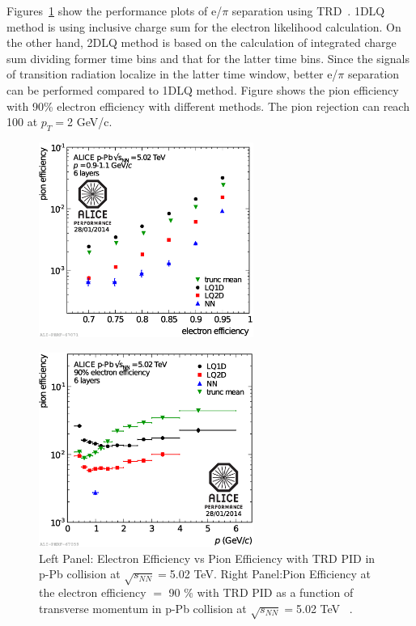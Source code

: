 Figures~\ref{fig_3_trdepi} show the performance plots of e/$\pi$ separation using TRD~\cite{bib_aprrun1}.
1DLQ method is using inclusive charge sum for the electron likelihood calculation. 
On the other hand, 2DLQ method is based on the calculation of integrated charge sum dividing former time bins and that for the latter time bins. 
Since the signals of transition radiation localize in the latter time window, better e/$\pi$ separation can be performed compared to 1DLQ method.
Figure shows the pion efficiency with 90\% electron efficiency with different methods.
The pion rejection can reach 100 at $p_{T}=$2 GeV/c. 
\begin{figure}[!h]
 \begin{minipage}{0.5\hsize}
  \begin{center}
  \includegraphics[width=7cm]{chap3/figure/TRD/TRDEleEffvsPiEff.eps}
  \end{center}
  \label{fig_3_trd_1}
 \end{minipage}
 \begin{minipage}{0.5\hsize}
  \begin{center}
  \includegraphics[width=7cm]{chap3/figure/TRD/TRDPionEffvsP_pPb.eps}
  \end{center}
 \end{minipage}
  \caption{Left Panel: Electron Efficiency vs Pion Efficiency with TRD PID in p-Pb collision at $\sqrt{s_{NN}}=$5.02 TeV. Right Panel:Pion Efficiency at the electron efficiency $=$ 90 \% with TRD PID as a function of transverse momentum in p-Pb collision at $\sqrt{s_{NN}}=$5.02 TeV~\cite{bib_aprrun1}
.
}
  \label{fig_3_trdepi}
\end{figure}


